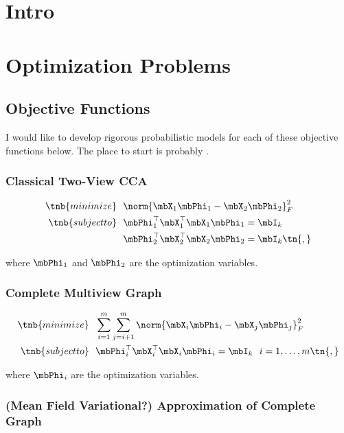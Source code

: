 \documentclass{article}
\begin{document}
\section{Intro} \label{sec:intro}
\section{Optimization Problems} \label{sec:model}

	\subsection{Objective Functions} \label{subsec:objective}
	I would like to develop rigorous probabilistic models for each of these objective functions below. The place to start is probably \cite{bach2005probabilistic}.
	
	\subsubsection{Classical Two-View CCA} \label{subsubsec:classicalcca}
	
	\begin{align*}
		\tnb{minimize}&\ \ \norm{\mbX_1 \mbPhi_1 - \mbX_2 \mbPhi_2}_F^2\\
		\tnb{subject to}&\ \  \mbPhi_1^{\top}\mbX_1^{\top}\mbX_1\mbPhi_1 = \mbI_k\\
		&\ \ \mbPhi_2^{\top}\mbX_2^{\top}\mbX_2\mbPhi_2 = \mbI_k \tn{,}
	\end{align*}
	
	\noindent where $\mbPhi_1$ and $\mbPhi_2$ are the optimization variables.
	
	\subsubsection{Complete Multiview Graph} \label{subsubsec:cgraph}
	
	\begin{align*}
		\tnb{minimize}&\ \ \sum_{i=1}^m \sum_{j=i+1}^m \norm{\mbX_i \mbPhi_i - \mbX_j \mbPhi_j}_F^2\\
		\tnb{subject to}&\ \  \mbPhi_i^{\top}\mbX_i^{\top}\mbX_i\mbPhi_i = \mbI_k\ \ i=1,\ldots,m \tn{,}
	\end{align*}
	
	\noindent where $\mbPhi_i$ are the optimization variables.
	
	\subsubsection{(Mean Field Variational?) Approximation of Complete Graph} \label{subsubsec:approxfcgraph}
	
\end{document}
